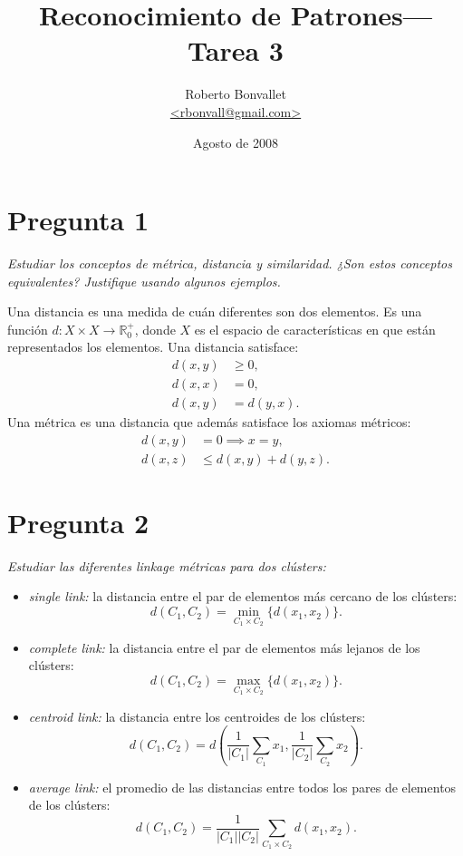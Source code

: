 \documentclass[spanish]{article}
\title{Reconocimiento de Patrones---Tarea 3}
\author{Roberto Bonvallet \\ \url {<rbonvall@gmail.com>}}
\date{Agosto de 2008}
\newcommand{\pregunta}{\textit}
\newcommand{\card}[1]{\lvert#1\rvert}
\newcommand{\R}{\mathbb{R}}
\begin{document}
\maketitle

\section*{Pregunta 1}
\pregunta{
    Estudiar los conceptos de métrica, distancia y similaridad.
    ¿Son estos conceptos equivalentes?
    Justifique usando algunos ejemplos.
}

Una distancia es una medida de cuán diferentes son dos elementos.  Es una
función $d:X\times X\to\R_0^+$, donde $X$ es el espacio de características en
que están representados los elementos.  Una distancia satisface\footnotemark:
\begin{align*}
    d(x, y) &\ge 0, \\ d(x, x) &= 0, \\ d(x, y) &= d(y, x).
\end{align*}
Una métrica es una distancia que además satisface los axiomas métricos:
\begin{align*}
    d(x, y) &= 0\implies x = y, \\
    d(x, z) &\le d(x, y) + d(y, z).
\end{align*}






\section*{Pregunta 2}
\pregunta{Estudiar las diferentes linkage métricas para dos clústers:}
\begin{itemize}
    \item \pregunta{single link:} la distancia entre el par de elementos más cercano de los
        clústers:
        \[d(C_1, C_2) = \min_{C_1\times C_2}\bigl\{d(x_1, x_2)\bigr\}.\]
    \item \pregunta{complete link:} la distancia entre el par de elementos más lejanos de los
        clústers:
        \[d(C_1, C_2) = \max_{C_1\times C_2}\bigl\{d(x_1, x_2)\bigr\}.\]
    \item \pregunta{centroid link:} la distancia entre los centroides de los clústers:
        \[d(C_1, C_2) = d\left(\frac{1}{\card{C_1}}\sum_{C_1} x_1, \frac{1}{\card{C_2}}\sum_{C_2} x_2\right).\]
    \item \pregunta{average link:} el promedio de las distancias entre todos los pares de elementos
        de los clústers:
        \[d(C_1, C_2) = \frac{1}{\card{C_1}\card{C_2}}\sum_{C_1\times C_2} d(x_1, x_2).\]
\end{itemize}
\end{document}
